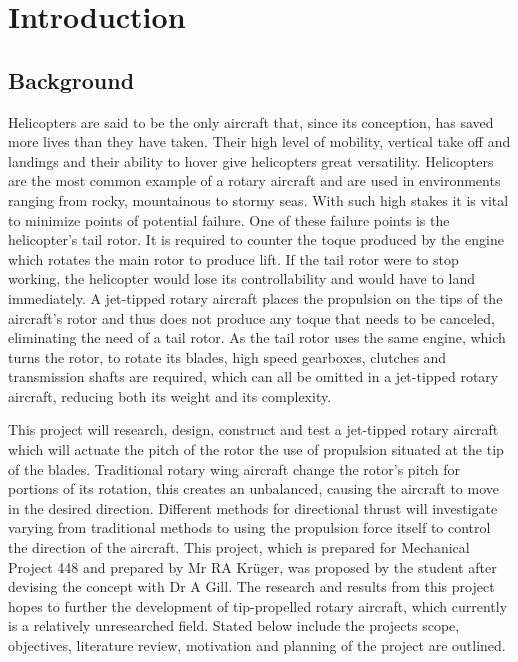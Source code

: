 \chapter{Introduction}

\section{Background}

    Helicopters are said to be the only aircraft that, since its conception, has saved more lives than they have taken. Their  high level of mobility, vertical take off and landings and their ability to hover give helicopters great versatility. Helicopters are the most common example of a rotary aircraft and are used in environments ranging from rocky, mountainous to stormy seas. With such high stakes it is vital to minimize points of potential failure. One of these failure points is the helicopter's tail rotor. It is required to counter the toque produced by the engine which rotates the main rotor to produce lift. If the tail rotor were to stop working, the helicopter would lose its controllability and would have to land immediately. A jet-tipped rotary aircraft places the propulsion on the tips of the aircraft's rotor and thus does not produce any toque that needs to be canceled, eliminating the need of a tail rotor. As the tail rotor uses the same engine, which turns the rotor, to rotate its blades, high speed gearboxes, clutches and transmission shafts are required, which can all be omitted in a jet-tipped rotary aircraft, reducing both its weight and its complexity.

    \vspace{3mm}
    This project will research, design, construct and test a jet-tipped rotary aircraft which will actuate the pitch of the rotor  the use of propulsion situated at the tip of the blades. Traditional rotary wing aircraft change the rotor's pitch for portions of its rotation, this creates an unbalanced, causing the aircraft to move in the desired direction. Different methods for directional thrust will investigate varying from traditional methods to using the propulsion force itself to control the direction of the aircraft. 
    \vspace*{3mm}
    This project, which is prepared for Mechanical Project 448 and prepared by Mr RA Krüger, was proposed by the student after devising the concept with Dr A Gill. The research and results from this project hopes to further the development of tip-propelled rotary aircraft, which currently is a relatively unresearched field.    Stated below include the projects scope, objectives, literature review, motivation and planning of the project are outlined. 


